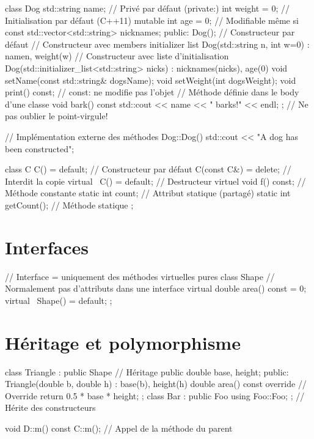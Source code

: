 \documentclass{article}
\begin{document}
\begin{multicols*}{4}
\begin{cppcode}
class Dog {
    std::string name; // Privé par défaut (private:)
    int weight = 0; // Initialisation par défaut (C++11)
    mutable int age = 0; // Modifiable même si const
    std::vector<std::string> nicknames;
public:
    Dog(); // Constructeur par défaut
    // Constructeur avec members initializer list
    Dog(std::string n, int w=0) : name{n}, weight(w) {}
    // Constructeur avec liste d'initialisation
    Dog(std::initializer_list<std::string> nicks)
        : nicknames(nicks), age(0) {}
    void setName(const std::string& dogsName);
    void setWeight(int dogsWeight);
    void print() const; // const: ne modifie pas l'objet
    // Méthode définie dans le body d'une classe
    void bark() const { std::cout << name << " barks!" << endl; }
}; // Ne pas oublier le point-virgule!

// Implémentation externe des méthodes
Dog::Dog() {
    std::cout << "A dog has been constructed\n";
}

class C {
    C() = default; // Constructeur par défaut
    C(const C&) = delete; // Interdit la copie
    virtual ~C() = default; // Destructeur virtuel
    void f() const; // Méthode constante
    static int count; // Attribut statique (partagé)
    static int getCount(); // Méthode statique
};
\end{cppcode}

\section*{Interfaces}
\begin{cppcode}
// Interface = uniquement des méthodes virtuelles pures
class Shape {
    // Normalement pas d'attributs dans une interface
    virtual double area() const = 0;
    virtual ~Shape() = default;
};
\end{cppcode}

\section*{Héritage et polymorphisme}
\begin{cppcode}
class Triangle : public Shape { // Héritage public
    double base, height;
public:
    Triangle(double b, double h)
        : base(b), height(h) {}
    double area() const override { // Override
        return 0.5 * base * height; }
};
class Bar : public Foo {
    using Foo::Foo; }; // Hérite des constructeurs

void D::m() const {
    C::m(); } // Appel de la méthode du parent
\end{cppcode}


\end{multicols*}
\end{document}
